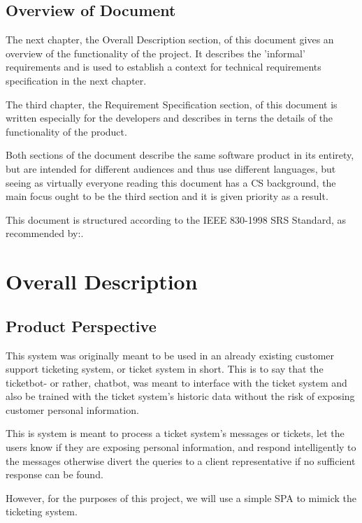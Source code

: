 \documentclass[11pt]{article}
\begin{document}
\subsection{Overview of Document}
The next chapter, the Overall Description section, of this document gives an overview of the functionality of the project. It describes the 'informal' requirements and is used to establish a context for technical requirements specification in the next chapter.\par
The third chapter, the Requirement Specification section, of this document is written especially for the developers and describes in terns the details of the functionality of the product.\par
Both sections of the document describe the same software product in its entirety, but are intended for different audiences and thus use different languages, but seeing as virtually everyone reading this document has a CS background, the main focus ought to be the third section and it is given priority as a result.\par
This document is structured according to the IEEE 830-1998 SRS Standard\cite{Standard:1}, as recommended by:\cite{Book:1}.

\section{Overall Description}
\subsection{Product Perspective}
 
This system was originally meant to be used in an already existing customer support ticketing system, or ticket system in short. This is to say that the ticketbot- or rather, chatbot, was meant to interface with the ticket system and also be trained with the ticket system's historic data without the risk of exposing customer personal information.\par

This is system is meant to process a ticket system's messages or tickets, let the users know if they are exposing personal information, and respond intelligently to the messages otherwise divert the queries to a client representative if no sufficient response can be found.\par

However, for the purposes of this project, we will use a simple SPA to mimick the ticketing system.
\end{document}
